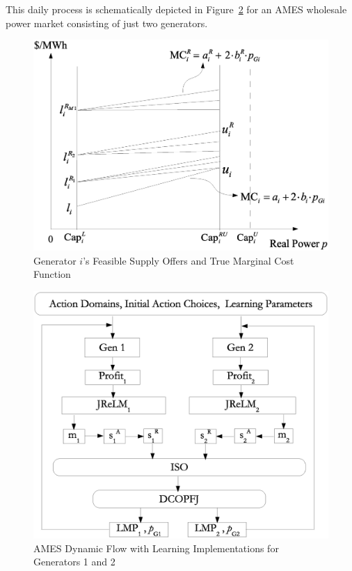 \documentclass[12pt]{article}
\begin{document}
This daily process is schematically depicted in Figure~\ref{fig:dynamicFlow} for an AMES wholesale power market consisting of just two generators.

  




\begin{figure}[p]
	\centering
		\includegraphics[totalheight = 10cm]{AMES.SupplyOffer.eps}
	\caption{Generator $i$'s Feasible Supply Offers and True Marginal Cost Function}
	\label{fig:supplyOffer}
\end{figure}

\begin{figure}[p]
	\centering
		\includegraphics[totalheight = 10cm]{AMES.DynamicFlow.eps}
	\caption{AMES Dynamic Flow with Learning Implementations for Generators 1 and 2}
	\label{fig:dynamicFlow}
\end{figure}
\end{document}
